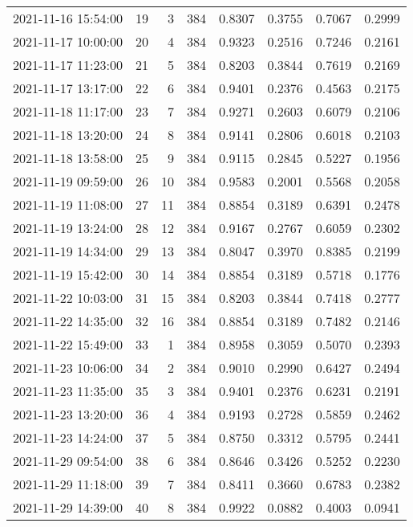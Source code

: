 \begin{table}
\begin{tabular}{lrrrrrrr}
2021-11-16 15:54:00 &   19 &    3 &    384 &   0.8307 & 0.3755 & 0.7067 & 0.2999 \\
2021-11-17 10:00:00 &   20 &    4 &    384 &   0.9323 & 0.2516 & 0.7246 & 0.2161 \\
2021-11-17 11:23:00 &   21 &    5 &    384 &   0.8203 & 0.3844 & 0.7619 & 0.2169 \\
2021-11-17 13:17:00 &   22 &    6 &    384 &   0.9401 & 0.2376 & 0.4563 & 0.2175 \\
2021-11-18 11:17:00 &   23 &    7 &    384 &   0.9271 & 0.2603 & 0.6079 & 0.2106 \\
2021-11-18 13:20:00 &   24 &    8 &    384 &   0.9141 & 0.2806 & 0.6018 & 0.2103 \\
2021-11-18 13:58:00 &   25 &    9 &    384 &   0.9115 & 0.2845 & 0.5227 & 0.1956 \\
2021-11-19 09:59:00 &   26 &   10 &    384 &   0.9583 & 0.2001 & 0.5568 & 0.2058 \\
2021-11-19 11:08:00 &   27 &   11 &    384 &   0.8854 & 0.3189 & 0.6391 & 0.2478 \\
2021-11-19 13:24:00 &   28 &   12 &    384 &   0.9167 & 0.2767 & 0.6059 & 0.2302 \\
2021-11-19 14:34:00 &   29 &   13 &    384 &   0.8047 & 0.3970 & 0.8385 & 0.2199 \\
2021-11-19 15:42:00 &   30 &   14 &    384 &   0.8854 & 0.3189 & 0.5718 & 0.1776 \\
2021-11-22 10:03:00 &   31 &   15 &    384 &   0.8203 & 0.3844 & 0.7418 & 0.2777 \\
2021-11-22 14:35:00 &   32 &   16 &    384 &   0.8854 & 0.3189 & 0.7482 & 0.2146 \\
2021-11-22 15:49:00 &   33 &    1 &    384 &   0.8958 & 0.3059 & 0.5070 & 0.2393 \\
2021-11-23 10:06:00 &   34 &    2 &    384 &   0.9010 & 0.2990 & 0.6427 & 0.2494 \\
2021-11-23 11:35:00 &   35 &    3 &    384 &   0.9401 & 0.2376 & 0.6231 & 0.2191 \\
2021-11-23 13:20:00 &   36 &    4 &    384 &   0.9193 & 0.2728 & 0.5859 & 0.2462 \\
2021-11-23 14:24:00 &   37 &    5 &    384 &   0.8750 & 0.3312 & 0.5795 & 0.2441 \\
2021-11-29 09:54:00 &   38 &    6 &    384 &   0.8646 & 0.3426 & 0.5252 & 0.2230 \\
2021-11-29 11:18:00 &   39 &    7 &    384 &   0.8411 & 0.3660 & 0.6783 & 0.2382 \\
2021-11-29 14:39:00 &   40 &    8 &    384 &   0.9922 & 0.0882 & 0.4003 & 0.0941 \\
\bottomrule
\end{tabular}
\end{table}
